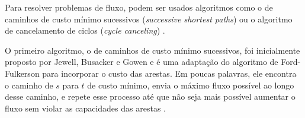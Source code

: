 Para resolver problemas de fluxo, podem ser usados algoritmos como o de caminhos de custo mínimo sucessivos (\textit{successive shortest paths}) ou o algoritmo de cancelamento de ciclos (\textit{cycle canceling}) \cite{schrijver}.


O primeiro algoritmo, o de caminhos de custo mínimo sucessivos, foi inicialmente proposto por Jewell, Busacker e Gowen e é uma adaptação do algoritmo de Ford-Fulkerson para incorporar o custo das arestas. Em poucas palavras, ele encontra o caminho de $s$ para $t$ de custo mínimo, envia o máximo fluxo possível ao longo desse caminho, e repete esse processo até que não seja mais possível aumentar o fluxo sem violar as capacidades das arestas \cite{schrijver}.

\begin{algorithm}[H]
    \DontPrintSemicolon
    \SetAlgoLined

    \caption{Algoritmo de caminhos de custo mínimo sucessivos \cite{jungnickel}}
    \label{alg:optflow}
\end{algorithm}

